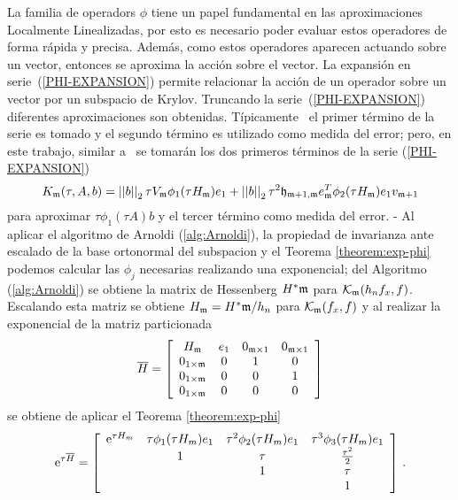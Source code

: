 La familia de operadors $\phi$ tiene un papel fundamental en las aproximaciones Localmente Linealizadas, por esto es necesario poder evaluar estos operadores de forma rápida y precisa. Además, como estos operadores aparecen actuando sobre un vector, entonces se aproxima la acción sobre el vector. La expansión en serie~(\ref{PHI-EXPANSION}) permite relacionar la acción de un operador sobre un vector por un subspacio de Krylov. Truncando la serie~(\ref{PHI-EXPANSION}) diferentes aproximaciones son obtenidas. Típicamente~\cite{niesen2009krylov,sidje1998expokit,tokman2006efficient} el primer término de la serie es tomado y el segundo término es utilizado como medida del error; pero, en este trabajo, similar a~\cite{Saad92} se tomarán los dos primeros términos de la serie (\ref{PHI-EXPANSION})
 \begin{equation}\label{exact-two-terms-km}
    K_{\mathfrak{m}}(\tau,A,b) = \left\lvert \left\lvert  b  \right\rvert \right\rvert_2\tau V_{\mathfrak{m}}\phi_1(\tau H_{\mathfrak{m}})e_1 + \left\lvert \left\lvert  b  \right\rvert \right\rvert_2\tau^2\mathfrak{h}_{\mathfrak{m}+1,\mathfrak{m}}e^T_{\mathfrak{m}}\phi_2(\tau H_{\mathfrak{m}})e_1v_{\mathfrak{m}+1}
 \end{equation}
para aproximar $\tau\phi_1(\tau A)b$ y el tercer término como medida del error.
-
Al aplicar el algoritmo de Arnoldi (\ref{alg:Arnoldi}), la propiedad de invarianza ante escalado de la base ortonormal del subspacion y el Teorema \ref{theorem:exp-phi} podemos calcular las $\phi_j$ necesarias realizando una exponencial; del Algoritmo (\ref{alg:Arnoldi}) se obtiene la matrix de Hessenberg $H^*\mathfrak{m}$ para $\mathcal{K}_{\mathfrak{m}}(h_n f_x,f)$. Escalando esta matriz se obtiene $H_{\mathfrak{m}}=H^*\mathfrak{m}/h_n$ para $\mathcal{K}_{\mathfrak{m}}(f_x,f)$ y al realizar la exponencial de la matriz particionada
\begin{equation*}
    \overline{H} = \left[\begin{array}{cccc}
    H_{\mathfrak{m}} & e_1 & 0_{\mathfrak{m}\times 1} & 0_{\mathfrak{m}\times 1}\\
    0_{1\times\mathfrak{m}} & 0 & 1 & 0\\
    0_{1\times\mathfrak{m}} & 0 & 0 & 1\\
    0_{1\times\mathfrak{m}} & 0 & 0 & 0
    \end{array}\right] \label{hhat_hessenberg_matrix}
    \end{equation*}
se obtiene de aplicar el Teorema \ref{theorem:exp-phi}
\begin{equation}
    \mathrm{e}^{\tau\overline{H}} = \left[\begin{array}{cccc}
    \mathrm{e}^{\tau H_m} & \tau\phi_1(\tau H_m)e_1 & \tau^{2}\phi_2(\tau H_m)e_1 &
    \tau^{3}\phi_3(\tau H_m)e_1 \\
    & 1 & \tau & \frac{\tau^{2}}{2}\\
    &  & 1 & \tau \\
    &   &   & 1 \\
    \end{array}\right] \,. \label{phi_hhat_exponential}
\end{equation}

